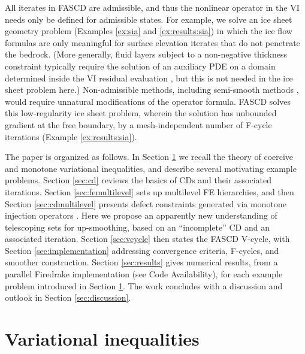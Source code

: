 \documentclass[letterpaper,final,12pt,reqno]{amsart}
\theoremstyle{cstyle}
\theoremstyle{cstyle*}
\theoremstyle{dstyle}
\numberwithin{equation}{section}
\numberwithin{figure}{section}
\numberwithin{table}{section}
\numberwithin{theorem}{section}
\begin{document}
All iterates in FASCD are admissible, and thus the nonlinear operator in the VI needs only be defined for admissible states.  For example, we solve an ice sheet geometry problem (Examples \ref{ex:sia} and \ref{ex:results:sia}) in which the ice flow formulas are only meaningful for surface elevation iterates that do not penetrate the bedrock.  (More generally, fluid layers subject to a non-negative thickness constraint typically require the solution of an auxiliary PDE on a domain determined inside the VI residual evaluation \cite{Bueler2021conservation}, but this is not needed in the ice sheet problem here.)  Non-admissible methods, including semi-smooth methods \cite{BensonMunson2006}, would require unnatural modifications of the operator formula.  FASCD solves this low-regularity ice sheet problem, wherein the solution has unbounded gradient at the free boundary, by a mesh-independent number of F-cycle iterations (Example \ref{ex:results:sia}).

The paper is organized as follows.  In Section \ref{sec:vi} we recall the theory of coercive and monotone variational inequalities, and describe several motivating example problems.  Section \ref{sec:cd} reviews the basics of CDs and their associated iterations.  Section \ref{sec:femultilevel} sets up multilevel FE hierarchies, and then Section \ref{sec:cdmultilevel} presents defect constraints generated via monotone injection operators \cite{GraeserKornhuber2009}.  Here we propose an apparently new understanding of telescoping sets for up-smoothing, based on an ``incomplete'' CD and an associated iteration.  Section \ref{sec:vcycle} then states the FASCD V-cycle, with Section \ref{sec:implementation} addressing convergence criteria, F-cycles, and smoother construction.  Section \ref{sec:results} gives numerical results, from a parallel Firedrake \cite{Rathgeberetal2016} implementation (see Code Availability), for each example problem introduced in Section \ref{sec:vi}.  The work concludes with a discussion and outlook in Section \ref{sec:discussion}.


\section{Variational inequalities} \label{sec:vi}
\end{document}
